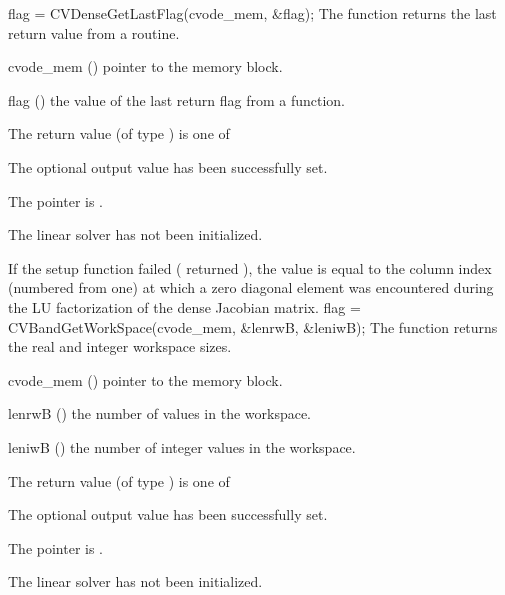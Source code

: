 {
  flag = CVDenseGetLastFlag(cvode\_mem, \&flag);
}
{
  The function  returns the
  last return value from a {\cvdense} routine. 
}
{
  \begin{args}
  \item[cvode\_mem] ()
    pointer to the {\cvode} memory block.
  \item[flag] ()
    the value of the last return flag from a {\cvdense} function.
  \end{args}
}
{
  The return value  (of type ) is one of
  \begin{args}
  \item[\Id{CVDENSE\_SUCCESS}] 
    The optional output value has been successfully set.
  \item[\Id{CVDENSE\_MEM\_NULL}]
    The  pointer is .
  \item[\Id{CVDENSE\_LMEM\_NULL}]
    The {\cvdense} linear solver has not been initialized.
  \end{args}
}
{
  If the {\cvdense} setup function failed ( returned ),
  the value  is equal to the column index (numbered from one) at which
  a zero diagonal element was encountered during the LU factorization of the 
  dense Jacobian matrix.
}
%
%
{
  flag = CVBandGetWorkSpace(cvode\_mem, \&lenrwB, \&leniwB);
}
{
  The function  returns the
  {\cvband} real and integer workspace sizes.
}
{
  \begin{args}
  \item[cvode\_mem] ()
    pointer to the {\cvode} memory block.
  \item[lenrwB] ()
    the number of  values in the {\cvband} workspace.
  \item[leniwB] ()
    the number of integer values in the {\cvband} workspace.
  \end{args}
}
{
  The return value  (of type ) is one of
  \begin{args}
  \item[\Id{CVBAND\_SUCCESS}] 
    The optional output value has been successfully set.
  \item[\Id{CVBAND\_MEM\_NULL}]
    The  pointer is .
  \item[\Id{CVBAND\_LMEM\_NULL}]
    The {\cvband} linear solver has not been initialized.
  \end{args}
}
